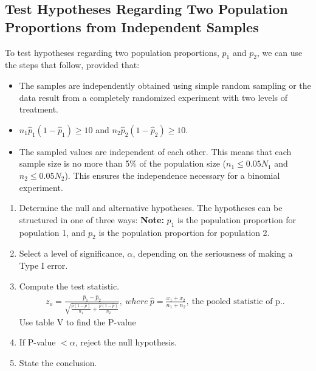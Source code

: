 \documentclass{report}
\begin{document}
    \subsection*{Test Hypotheses Regarding Two Population Proportions from Independent Samples}
    \bigbreak \noindent 
        To test hypotheses regarding two population proportions, \(p_1\) and \(p_2\), we can use the steps that follow, provided that:
    \begin{itemize}
        \item The samples are independently obtained using simple random sampling or the data result from a completely randomized experiment with two levels of treatment.
        \item \(n_1\hat{p}_1(1-\hat{p}_1) \geq 10\) and \(n_2\hat{p}_2(1-\hat{p}_2) \geq 10\).
        \item The sampled values are independent of each other. This means that each sample size is no more than 5\% of the population size (\(n_1 \leq 0.05N_1\) and \(n_2 \leq 0.05N_2\)). This ensures the independence necessary for a binomial experiment.
    \end{itemize}
    \bigbreak \noindent 
    \begin{enumerate}
        \item Determine the null and alternative hypotheses. The hypotheses can be structured in one of three ways:
            \textbf{Note:} $p_{1}$  is the population proportion for population 1, and $p_{2}$ is the population proportion for population 2.
        \item  Select a level of significance, $\alpha$, depending on the seriousness of making a Type I error.
        \item Compute the test statistic.
            \begin{align*}
                z_o = \frac{\hat{p}_1 - \hat{p}_2}{\sqrt{\frac{\hat{p}(1-\hat{p})}{n_1} + \frac{\hat{p}(1-\hat{p})}{n_2}}},\ where\ \hat{p} = \frac{x_1 + x_2}{n_1 + n_2},\ \text{the pooled statistic of p.}
            .\end{align*}
            Use table V to find the P-value
        \item If P-value $< \alpha$, reject the null hypothesis.
        \item State the conclusion.
    \end{enumerate}

    \bigbreak \noindent \bigbreak \noindent 
\end{document}
